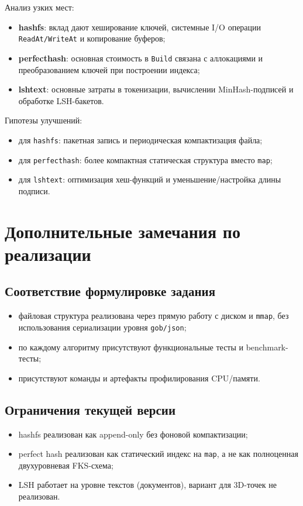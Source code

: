 \documentclass{itmo}
\begin{document}
Анализ узких мест:
\begin{itemize}
	\item \textbf{hashfs}: вклад дают хеширование ключей, системные I/O операции \texttt{ReadAt/WriteAt} и копирование буферов;
	\item \textbf{perfecthash}: основная стоимость в \texttt{Build} связана с аллокациями и преобразованием ключей при построении индекса;
	\item \textbf{lshtext}: основные затраты в токенизации, вычислении MinHash-подписей и обработке LSH-бакетов.
\end{itemize}

Гипотезы улучшений:
\begin{itemize}
	\item для \texttt{hashfs}: пакетная запись и периодическая компактизация файла;
	\item для \texttt{perfecthash}: более компактная статическая структура вместо \texttt{map};
	\item для \texttt{lshtext}: оптимизация хеш-функций и уменьшение/настройка длины подписи.
\end{itemize}

\chapter{Дополнительные замечания по реализации}

\section{Соответствие формулировке задания}

\begin{itemize}
	\item файловая структура реализована через прямую работу с диском и \texttt{mmap}, без использования сериализации уровня \texttt{gob/json};
	\item по каждому алгоритму присутствуют функциональные тесты и benchmark-тесты;
	\item присутствуют команды и артефакты профилирования CPU/памяти.
\end{itemize}

\section{Ограничения текущей версии}

\begin{itemize}
	\item hashfs реализован как append-only без фоновой компактизации;
	\item perfect hash реализован как статический индекс на \texttt{map}, а не как полноценная двухуровневая FKS-схема;
	\item LSH работает на уровне текстов (документов), вариант для 3D-точек не реализован.
\end{itemize}
\end{document}
